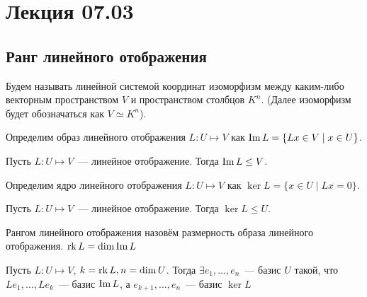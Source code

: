 \section{Лекция 07.03}
\subsection{Ранг линейного отображения}
\begin{definition}
    Будем называть линейной системой координат изоморфизм между каким-либо векторным пространством
    $V$ и пространством столбцов $K^n$. (Далее изоморфизм будет обозначаться как $V \simeq K^n$).
\end{definition}
\begin{definition}
    Определим образ линейного отображения $L\colon U\mapsto V$ как $\operatorname{Im} L = \{Lx\in V \mid x \in U\}$. 
\end{definition}
\begin{remark}
    Пусть $L: U\mapsto V$~--- линейное отображение. 
    Тогда $\operatorname{Im} L \leq V$.
\end{remark}
\begin{definition}
    Определим ядро линейного отображения $L\colon U\mapsto V$ как $\ker L = \{x\in U \mid Lx = 0\}$. 
\end{definition}
\begin{remark}
    Пусть $L: U\mapsto V$~--- линейное отображение. 
    Тогда $\ker L \leq U$.
\end{remark}
\begin{definition}
    Рангом линейного отображения назовём размерность образа линейного отображения.
    $\operatorname{rk} L = \dim \operatorname{Im} L$
\end{definition}
\begin{theorem}
    Пусть $L: U\mapsto V$, $k = \operatorname{rk} L, n = \dim U$. 
    Тогда $\exists e_1,\dots,e_n$~--- базис $U$ такой, что
    $Le_1,\dots, Le_k$~--- базис $\operatorname{Im} L$, а $e_{k+1},\dots,e_{n}$~--- базис $\ker L$
\end{theorem}
